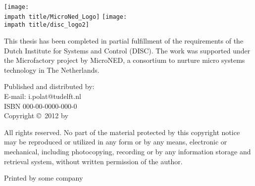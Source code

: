 
\noindent
{
\flushleft\texttt{[image: \\impath title/MicroNed\_Logo]}\hspace*{0.75cm}
\vspace{1em}
\texttt{[image: \\impath title/disc\_logo2]}
\vspace{1em}


\parbox{\textwidth}{\noindent This thesis has been completed in partial fulfillment of
the requirements of the Dutch Institute for Systems and Control
(DISC). The work was supported under the Microfactory project by
MicroNED, a consortium to nurture micro systems technology in
The Netherlands.
}
\bigskip{}


Published and distributed by: \theauthor \\
E-mail: i.polat@tudelft.nl\\

\bigskip{}
ISBN 000-00-0000-000-0\\
Copyright \copyright~2012 by \theauthor
}


\bigskip{}
\noindent All rights reserved. No part of the material protected by
this copyright notice may be reproduced or utilized in any form or
by any means, electronic or mechanical, including photocopying,
recording or by any information storage and retrieval system,
without written permission of the author.

\bigskip{}

\noindent Printed by some company
